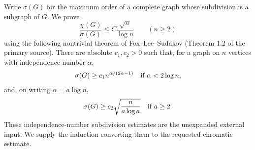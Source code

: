 Write $\sigma(G)$ for the maximum order of a complete graph whose subdivision is a subgraph of $G$. We prove
\[
 \frac{\chi(G)}{\sigma(G)}\leq C\frac{\sqrt n}{\log n}\qquad(n\geq2)
\]
using the following nontrivial theorem of Fox--Lee--Sudakov (Theorem 1.2 of the primary source). There are absolute $c_1,c_2>0$ such that, for a graph on $n$ vertices with independence number $\alpha$,
\[
 \sigma(G)\geq c_1n^{\alpha/(2\alpha-1)}
       \quad\hbox{if }\alpha<2\log n,
\]
and, on writing $\alpha=a\log n$,
\[
 \sigma(G)\geq c_2\sqrt{\frac n{a\log a}}
       \quad\hbox{if }a\geq2.
\]
These independence-number subdivision estimates are the unexpanded external input. We supply the induction converting them to the requested chromatic estimate.
